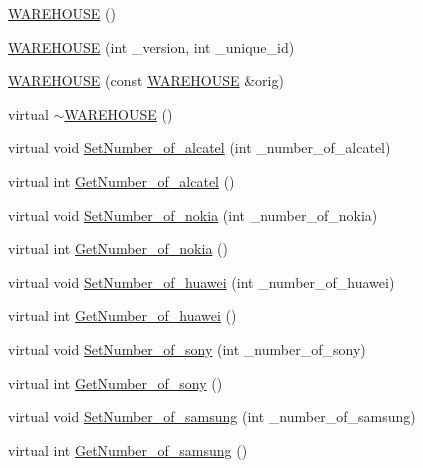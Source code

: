 \begin{DoxyCompactItemize}
\item 
\hyperlink{class_w_a_r_e_h_o_u_s_e_a7a924d389af91f54ed0e1d1d8d56ec57}{W\+A\+R\+E\+H\+O\+U\+SE} ()
\item 
\hyperlink{class_w_a_r_e_h_o_u_s_e_a91a50ed8f6eeb344b1785f750532b18a}{W\+A\+R\+E\+H\+O\+U\+SE} (int \+\_\+version, int \+\_\+unique\+\_\+id)
\item 
\hyperlink{class_w_a_r_e_h_o_u_s_e_a4782d251d2203377f8e9f331ba3b0a7e}{W\+A\+R\+E\+H\+O\+U\+SE} (const \hyperlink{class_w_a_r_e_h_o_u_s_e}{W\+A\+R\+E\+H\+O\+U\+SE} \&orig)
\item 
virtual \hyperlink{class_w_a_r_e_h_o_u_s_e_ad5aa686839d7be9bfea33d469c58086b}{$\sim$\+W\+A\+R\+E\+H\+O\+U\+SE} ()
\item 
virtual void \hyperlink{class_w_a_r_e_h_o_u_s_e_a91b45d7d40a154308644a9f2b1767d28}{Set\+Number\+\_\+of\+\_\+alcatel} (int \+\_\+number\+\_\+of\+\_\+alcatel)
\item 
virtual int \hyperlink{class_w_a_r_e_h_o_u_s_e_a9d9d5bc37ddd3763ea633d07785b6020}{Get\+Number\+\_\+of\+\_\+alcatel} ()
\item 
virtual void \hyperlink{class_w_a_r_e_h_o_u_s_e_a300d1fe21a47e45c0d5d27e25add346f}{Set\+Number\+\_\+of\+\_\+nokia} (int \+\_\+number\+\_\+of\+\_\+nokia)
\item 
virtual int \hyperlink{class_w_a_r_e_h_o_u_s_e_a1a0f7539989c00290934e8b671f2fb1c}{Get\+Number\+\_\+of\+\_\+nokia} ()
\item 
virtual void \hyperlink{class_w_a_r_e_h_o_u_s_e_ad29bd0333bd7f17178dc107a00e23954}{Set\+Number\+\_\+of\+\_\+huawei} (int \+\_\+number\+\_\+of\+\_\+huawei)
\item 
virtual int \hyperlink{class_w_a_r_e_h_o_u_s_e_acacc58d1ceea41e968a6d245007ea127}{Get\+Number\+\_\+of\+\_\+huawei} ()
\item 
virtual void \hyperlink{class_w_a_r_e_h_o_u_s_e_a709e5a9f4b439d0507fe74cc1a362ee1}{Set\+Number\+\_\+of\+\_\+sony} (int \+\_\+number\+\_\+of\+\_\+sony)
\item 
virtual int \hyperlink{class_w_a_r_e_h_o_u_s_e_abb7da1fee113e81fbb06190606fddb4d}{Get\+Number\+\_\+of\+\_\+sony} ()
\item 
virtual void \hyperlink{class_w_a_r_e_h_o_u_s_e_a5564efbb5f54f663208a17c6f7f440e2}{Set\+Number\+\_\+of\+\_\+samsung} (int \+\_\+number\+\_\+of\+\_\+samsung)
\item 
virtual int \hyperlink{class_w_a_r_e_h_o_u_s_e_a817b030450f48bc24e3cc6de5dadefec}{Get\+Number\+\_\+of\+\_\+samsung} ()

\end{DoxyCompactItemize}
